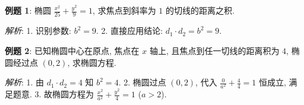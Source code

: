 \begin{examplebox}
\textbf{例题 1}: 椭圆 $\frac{x^2}{25} + \frac{y^2}{9} = 1$, 求焦点到斜率为 $1$ 的切线的距离之积.

\textit{解析}: 
1. 识别参数: $b^2 = 9$.
2. 直接应用结论: $d_1 \cdot d_2 = b^2 = 9$.

\textbf{例题 2}: 已知椭圆中心在原点, 焦点在 $x$ 轴上, 且焦点到任一切线的距离积为 $4$, 椭圆经过点 $(0, 2)$, 求椭圆方程.

\textit{解析}:
1. 由 $d_1 \cdot d_2 = 4$ 知 $b^2 = 4$.
2. 椭圆过点 $(0, 2)$, 代入 $\frac{0}{a^2} + \frac{4}{4} = 1$ 恒成立, 满足题意.
3. 故椭圆方程为 $\frac{x^2}{a^2} + \frac{y^2}{4} = 1$ ($a > 2$).
\end{examplebox}